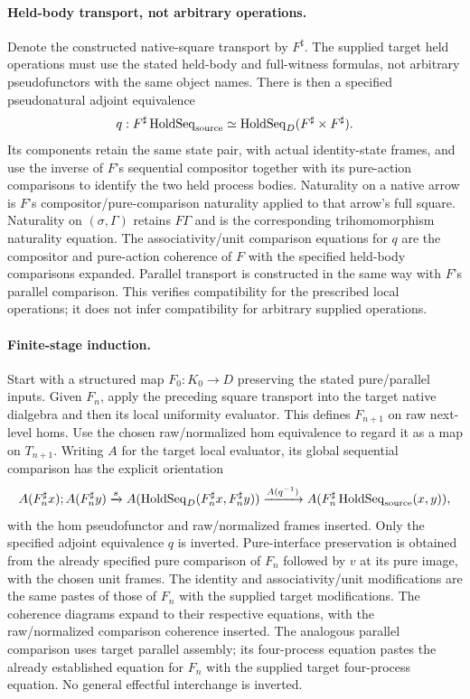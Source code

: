 \documentclass{article}
\begin{document}
\paragraph{Held-body transport, not arbitrary operations.} Denote the constructed native-square transport by $F^\sharp$. The supplied target held operations must use the stated held-body and full-witness formulas, not arbitrary pseudofunctors with the same object names. There is then a specified pseudonatural adjoint equivalence
\[
 q:F^\sharp\operatorname{HoldSeq}_{\rm source}
 \simeq\operatorname{HoldSeq}_D(F^\sharp\times F^\sharp).
\]
Its components retain the same state pair, with actual identity-state frames, and use the inverse of $F$'s sequential compositor together with its pure-action comparisons to identify the two held process bodies. Naturality on a native arrow is $F$'s compositor/pure-comparison naturality applied to that arrow's full square. Naturality on $(\sigma,\Gamma)$ retains $F\Gamma$ and is the corresponding trihomomorphism naturality equation. The associativity/unit comparison equations for $q$ are the compositor and pure-action coherence of $F$ with the specified held-body comparisons expanded. Parallel transport is constructed in the same way with $F$'s parallel comparison. This verifies compatibility for the prescribed local operations; it does not infer compatibility for arbitrary supplied operations.

\paragraph{Finite-stage induction.} Start with a structured map $F_0:K_0\to D$ preserving the stated pure/parallel inputs. Given $F_n$, apply the preceding square transport into the target native dialgebra and then its local uniformity evaluator. This defines $F_{n+1}$ on raw next-level homs. Use the chosen raw/normalized hom equivalence to regard it as a map on $T_{n+1}$. Writing $A$ for the target local evaluator, its global sequential comparison has the explicit orientation
\[
 A(F_n^\sharp x);A(F_n^\sharp y)
 \xrightarrow{s}A(\operatorname{HoldSeq}_D(F_n^\sharp x,F_n^\sharp y))
 \xrightarrow{A(q^{-1})}A(F_n^\sharp\operatorname{HoldSeq}_{\rm source}(x,y)),
\]
with the hom pseudofunctor and raw/normalized frames inserted. Only the specified adjoint equivalence $q$ is inverted. Pure-interface preservation is obtained from the already specified pure comparison of $F_n$ followed by $v$ at its pure image, with the chosen unit frames. The identity and associativity/unit modifications are the same pastes of those of $F_n$ with the supplied target modifications. The coherence diagrams expand to their respective equations, with the raw/normalized comparison coherence inserted. The analogous parallel comparison uses target parallel assembly; its four-process equation pastes the already established equation for $F_n$ with the supplied target four-process equation. No general effectful interchange is inverted.
\end{document}

